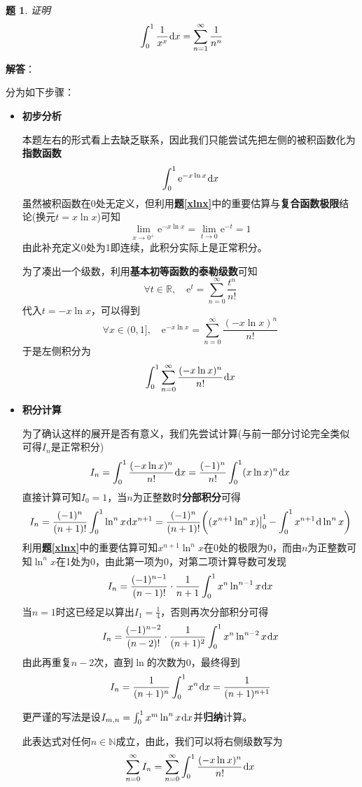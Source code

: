 \documentclass[a4paper,UTF8,fontset=windows,AutoFakeBold]{ctexart}
\newcommand*{\dr}{\hspace{0.07em}\mathrm{d}}
\newcommand*{\er}{\mathrm{e}}
\newcommand*{\rb}{\mathbb{R}}
\newcommand*{\suminf}[1][n=1]{\sum_{#1}^\infty}
\newcommand*{\note}{\noindent *}
\theoremstyle{ex}
\newtheorem{exercise}{题}
\newcommand{\exref}[1]{\textbf{题\;\ref{#1}\;}}
\newcommand{\sol}[1]{{\vspace{5pt}\kaishu\noindent\textbf{解答}：\vspace{-3pt}
\begin{compactitem}
    \item[] #1
\end{compactitem}
}}
\begin{document}
\begin{framed}
\begin{exercise}
    证明
    $$\int_0^1\frac{1}{x^x}\dr x=\suminf\frac{1}{n^n}$$
\end{exercise}
\sol{
    分为如下步骤：
    \begin{itemize}
        \item \textbf{初步分析}
        
        本题左右的形式看上去缺乏联系，因此我们只能尝试先把左侧的被积函数化为\textbf{指数函数}
        $$\int_0^1\er^{-x\ln x}\dr x$$
        虽然被积函数在0处无定义，但利用\exref{xlnx}中的重要估算与\textbf{复合函数极限}结论(换元$t=x\ln x$)可知
        $$\lim_{x\to0^+}\er^{-x\ln x}=\lim_{t\to0}\er^{-t}=1$$
        由此补充定义0处为1即连续，此积分实际上是正常积分。

        为了凑出一个级数，利用\textbf{基本初等函数的泰勒级数}可知
        $$\forall t\in\rb,\quad\er^t=\suminf[n=0]\frac{t^n}{n!}$$
        代入$t=-x\ln x$，可以得到
        $$\forall x\in(0,1],\quad\er^{-x\ln x}=\suminf[n=0]\frac{(-x\ln x)^n}{n!}$$
        于是左侧积分为
        $$\int_0^1\suminf[n=0]\frac{(-x\ln x)^n}{n!}\dr x$$

        \item \textbf{积分计算}
        
        为了确认这样的展开是否有意义，我们先尝试计算(与前一部分讨论完全类似可得$I_n$是正常积分)
        $$I_n=\int_0^1\frac{(-x\ln x)^n}{n!}\dr x=\frac{(-1)^n}{n!}\int_0^1(x\ln x)^n\dr x$$
        直接计算可知$I_0=1$，当$n$为正整数时\textbf{分部积分}可得
        $$I_n=\frac{(-1)^n}{(n+1)!}\int_0^1\ln^nx\dr x^{n+1}=\frac{(-1)^n}{(n+1)!}\bigg((x^{n+1}\ln^nx)\big|^1_0-\int_0^1x^{n+1}\dr\ln^nx\bigg)$$
        利用\exref{xlnx}中的重要估算可知$x^{n+1}\ln^nx$在0处的极限为0，而由$n$为正整数可知$\ln^nx$在1处为0，由此第一项为0，对第二项计算导数可发现
        $$I_n=\frac{(-1)^{n-1}}{(n-1)!}\cdot\frac{1}{n+1}\int_0^1x^n\ln^{n-1}x\dr x$$
        当$n=1$时这已经足以算出$I_1=\frac{1}{4}$，否则再次分部积分可得
        $$I_n=\frac{(-1)^{n-2}}{(n-2)!}\cdot\frac{1}{(n+1)^2}\int_0^1x^n\ln^{n-2}x\dr x$$
        由此再重复$n-2$次，直到$\ln$的次数为0，最终得到
        $$I_n=\frac{1}{(n+1)^n}\int_0^1x^n\dr x=\frac{1}{(n+1)^{n+1}}$$

        \note 更严谨的写法是设$I_{m,n}=\int_0^1x^m\ln^nx\dr x$并\textbf{归纳}计算。

        此表达式对任何$n\in\mathbb{N}$成立，由此，我们可以将右侧级数写为
        $$\suminf[n=0]I_n=\suminf[n=0]\int_0^1\frac{(-x\ln x)^n}{n!}\dr x$$


\end{itemize}}
\end{framed}
\end{document}
